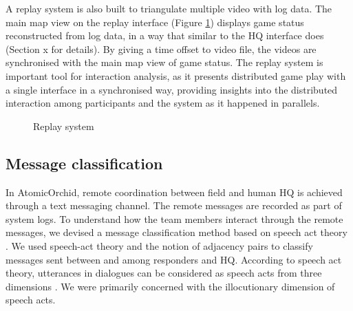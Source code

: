 A replay system is also built to triangulate multiple video with log data. The main map view on the replay interface (Figure \ref{fig:replay}) displays game status reconstructed from log data, in a way that similar to the HQ interface does (Section x for details). By giving a time offset to video file, the videos are synchronised with the main map view of game status. The replay system is important tool for interaction analysis, as it presents distributed game play with a single interface in a synchronised way, providing insights into the distributed interaction among participants and the system as it happened in parallels. \\

\begin{figure}[H]
  \centering
  
   \caption{Replay system}
  \label{fig:replay}
\end{figure}
\newpage
\subsection{Message classification} \label{sec:aprmsg}
In AtomicOrchid, remote coordination between field and human HQ is achieved through a text messaging channel. The remote messages are recorded as part of system logs. To understand how the team members interact through the remote messages, we devised a message classification method based on speech act theory \cite{Searle1976}. We used speech-act theory and the notion of adjacency pairs \cite{Avrahami} to classify messages sent between and among responders and HQ. According to speech act theory, utterances in dialogues can be considered as speech acts from three dimensions \cite{Searle1976}. We were primarily concerned with the illocutionary dimension of speech acts.\\

